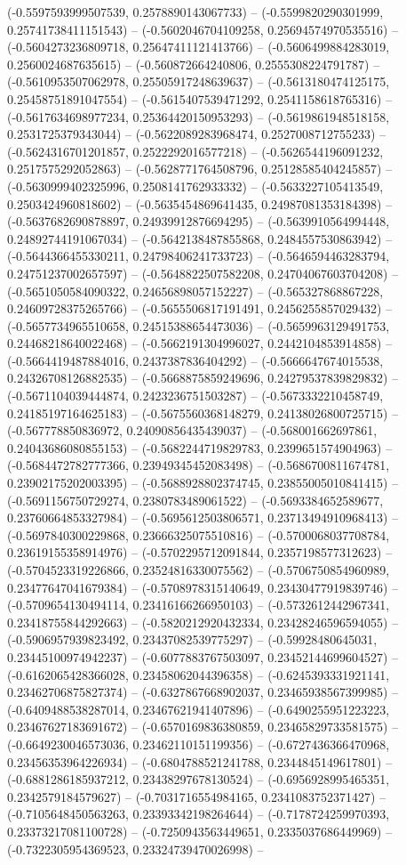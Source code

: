 (-0.5597593999507539, 0.2578890143067733) -- (-0.5599820290301999, 0.25741738411151543) -- (-0.5602046704109258, 0.25694574970535516) -- (-0.5604273236809718, 0.25647411121413766) -- (-0.5606499884283019, 0.2560024687635615) -- (-0.560872664240806, 0.2555308224791787) -- (-0.5610953507062978, 0.25505917248639637) -- (-0.5613180474125175, 0.25458751891047554) -- (-0.5615407539471292, 0.2541158618765316) -- (-0.5617634698977234, 0.25364420150953293) -- (-0.5619861948518158, 0.2531725379343044) -- (-0.5622089283968474, 0.2527008712755233) -- (-0.5624316701201857, 0.2522292016577218) -- (-0.5626544196091232, 0.2517575292052863) -- (-0.5628771764508796, 0.25128585404245857) -- (-0.5630999402325996, 0.2508141762933332) -- (-0.5633227105413549, 0.2503424960818602) -- (-0.5635454869641435, 0.24987081353184398) -- (-0.5637682690878897, 0.24939912876694295) -- (-0.5639910564994448, 0.24892744191067034) -- (-0.5642138487855868, 0.2484557530863942) -- (-0.5644366455330211, 0.24798406241733723) -- (-0.5646594463283794, 0.24751237002657597) -- (-0.5648822507582208, 0.24704067603704208) -- (-0.5651050584090322, 0.24656898057152227) -- (-0.565327868867228, 0.24609728375265766) -- (-0.5655506817191491, 0.2456255857029432) -- (-0.5657734965510658, 0.24515388654473036) -- (-0.5659963129491753, 0.24468218640022468) -- (-0.5662191304996027, 0.2442104853914858) -- (-0.5664419487884016, 0.2437387836404292) -- (-0.5666647674015538, 0.24326708126882535) -- (-0.5668875859249696, 0.24279537839829832) -- (-0.5671104039444874, 0.2423236751503287) -- (-0.5673332210458749, 0.24185197164625183) -- (-0.5675560368148279, 0.24138026800725715) -- (-0.567778850836972, 0.24090856435439037) -- (-0.568001662697861, 0.24043686080855153) -- (-0.5682244719829783, 0.2399651574904963) -- (-0.5684472782777366, 0.23949345452083498) -- (-0.5686700811674781, 0.23902175202003395) -- (-0.5688928802374745, 0.23855005010841415) -- (-0.5691156750729274, 0.2380783489061522) -- (-0.5693384652589677, 0.23760664853327984) -- (-0.5695612503806571, 0.23713494910968413) -- (-0.5697840300229868, 0.23666325075510816) -- (-0.5700068037708784, 0.23619155358914976) -- (-0.5702295712091844, 0.2357198577312623) -- (-0.5704523319226866, 0.23524816330075562) -- (-0.5706750854960989, 0.23477647041679384) -- (-0.5708978315140649, 0.23430477919839746) -- (-0.5709654130494114, 0.23416166266950103) -- (-0.5732612442967341, 0.23418755844292663) -- (-0.5820212920432334, 0.23428246596594055) -- (-0.5906957939823492, 0.23437082539775297) -- (-0.59928480645031, 0.23445100974942237) -- (-0.6077883767503097, 0.23452144699604527) -- (-0.6162065428366028, 0.23458062044396358) -- (-0.6245393331921141, 0.23462706875827374) -- (-0.6327867668902037, 0.23465938567399985) -- (-0.6409488538287014, 0.23467621941407896) -- (-0.6490255951223223, 0.23467627183691672) -- (-0.6570169836380859, 0.23465829733581575) -- (-0.6649230046573036, 0.23462110151199356) -- (-0.6727436366470968, 0.23456353964226934) -- (-0.6804788521241788, 0.2344845149617801) -- (-0.6881286185937212, 0.23438297678130524) -- (-0.6956928995465351, 0.2342579184579627) -- (-0.7031716554984165, 0.2341083752371427) -- (-0.7105648450563263, 0.23393342198264644) -- (-0.7178724259970393, 0.23373217081100728) -- (-0.7250943563449651, 0.2335037686449969) -- (-0.7322305954369523, 0.23324739470026998) -- 